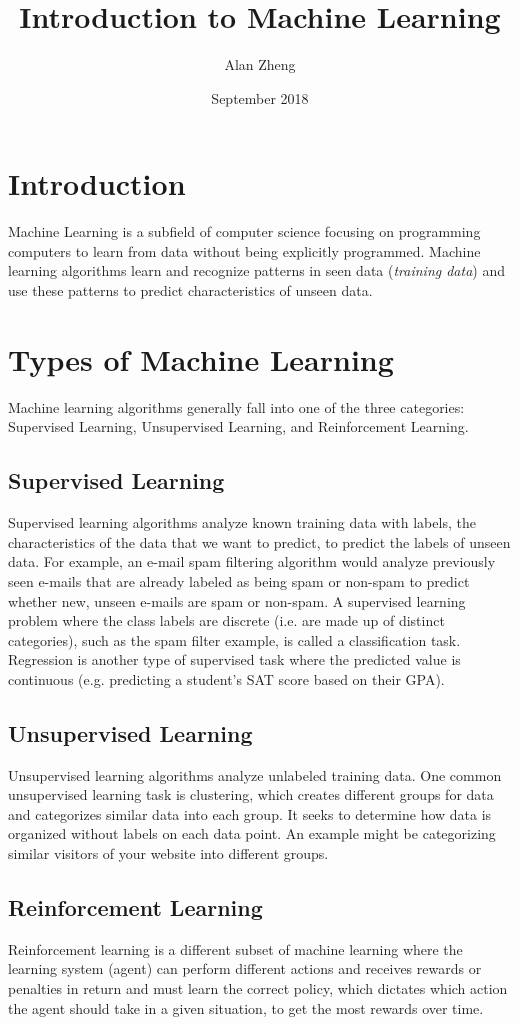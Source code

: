 \documentclass{article}
\title{Introduction to Machine Learning}
\author{Alan Zheng}
\date{September 2018}
\begin{document}
\maketitle

\section{Introduction}
Machine Learning is a subfield of computer science focusing on programming computers to learn from data without being explicitly programmed. Machine learning algorithms learn and recognize patterns in seen data (\textit{training data}) and use these patterns to predict characteristics of unseen data. 
\section{Types of Machine Learning}
Machine learning algorithms generally fall into one of the three categories: \newline
Supervised Learning, Unsupervised Learning, and Reinforcement Learning. 
\subsection{Supervised Learning}
Supervised learning algorithms analyze known training data with labels, the characteristics of the data that we want to predict, to predict the labels of unseen data. For example, an e-mail spam filtering algorithm would analyze previously seen e-mails that are already labeled as being spam or non-spam to predict whether new, unseen e-mails are spam or non-spam. A supervised learning problem where the class labels are discrete (i.e. are made up of distinct categories), such as the spam filter example, is called a classification task. Regression is another type of supervised task where the predicted value is continuous (e.g. predicting a student's SAT score based on their GPA). 
\subsection{Unsupervised Learning}
Unsupervised learning algorithms analyze unlabeled training data. One common unsupervised learning task is clustering, which creates different groups for data and categorizes similar data into each group. It seeks to determine how data is organized without labels on each data point. An example might be categorizing similar visitors of your website into different groups.
\subsection{Reinforcement Learning}
Reinforcement learning is a different subset of machine learning where the learning system (agent) can perform different actions and receives rewards or penalties in return and must learn the correct policy, which dictates which action the agent should take in a given situation, to get the most rewards over time.
\end{document}
